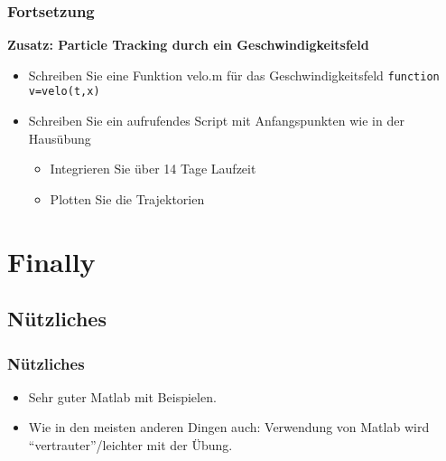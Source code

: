       \begin{frame}
		\frametitle{Fortsetzung}
          \begin{exercise}
              \sloppy          
              \textbf{Zusatz: Particle Tracking durch ein Geschwindigkeitsfeld}
              \begin{itemize}
                \item Schreiben Sie eine Funktion velo.m für das Geschwindigkeitsfeld
\texttt{function v=velo(t,x)}
				\item Schreiben Sie ein aufrufendes Script mit Anfangspunkten wie in der Hausübung 
				\begin{itemize}
					\item Integrieren Sie über 14 Tage Laufzeit
					\item Plotten Sie die Trajektorien
				\end{itemize}
              \end{itemize}
          \end{exercise}
      \end{frame}
      
      

  \section{Finally}

  \subsection{Nützliches}
  \begin{frame}
      \frametitle{Nützliches}
      \begin{itemize}
          \item Sehr guter Matlab  mit Beispielen.
          \item Wie in den meisten anderen Dingen auch: Verwendung von Matlab wird ``vertrauter''/leichter mit der Übung.
      \end{itemize}
  \end{frame}




